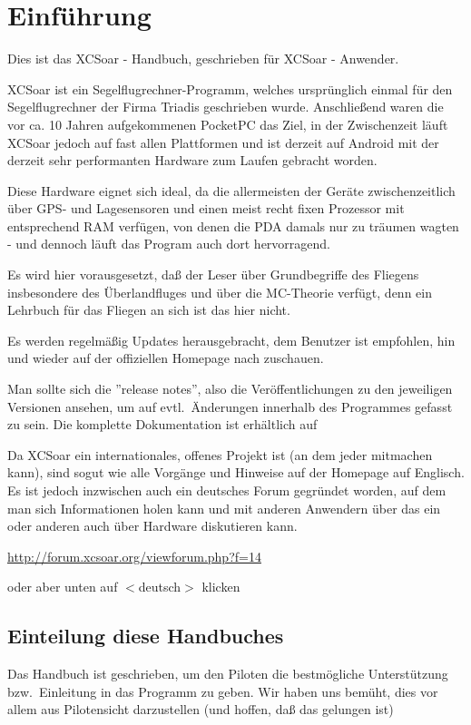 \chapter{Einführung}\label{cha:introduction}
Dies ist das \textsf{XCSoar} - Handbuch, geschrieben für \textsf{XCSoar} - Anwender. 

 

\textsf{XCSoar} ist ein Segelflugrechner-Programm, welches ursprünglich einmal für den Segelflugrechner \al der Firma Triadis geschrieben wurde.  
Anschließend waren die vor ca. 10 Jahren aufgekommenen PocketPC das Ziel, in der Zwischenzeit läuft \textsf{XCSoar} jedoch auf fast allen Plattformen und ist derzeit auf Android mit der derzeit 
sehr performanten Hardware zum Laufen gebracht worden. 

Diese Hardware eignet sich ideal, da die allermeisten der Geräte zwischenzeitlich über GPS- und Lagesensoren und einen 
meist recht fixen Prozessor mit entsprechend RAM verfügen, von denen die PDA damals nur zu träumen wagten - und dennoch 
läuft das Program auch dort hervorragend. 


Es wird hier vorausgesetzt, daß der Leser über Grundbegriffe des Fliegens insbesondere des Überlandfluges 
und über die MC-Theorie verfügt, denn ein Lehrbuch für das Fliegen an sich ist das hier nicht.


Es werden regelmäßig Updates herausgebracht, dem Benutzer ist empfohlen, hin und wieder auf der offiziellen Homepage nach zuschauen. 

Man sollte sich die ''release notes'', also die Veröffentlichungen zu den jeweiligen Versionen ansehen, um  auf evtl.\ Änderungen innerhalb des Programmes gefasst zu sein. 
Die komplette Dokumentation ist erhältlich auf  
\begin{center}
\xcsoarwebsite{}
\end{center}
Da \textsf{XCSoar} ein internationales, offenes Projekt ist (an dem jeder mitmachen kann), sind sogut wie alle Vorgänge und Hinweise auf der Homepage auf Englisch. 
Es ist jedoch inzwischen auch ein deutsches Forum gegründet worden, auf dem man sich Informationen holen kann und mit anderen Anwendern über das ein oder anderen auch über Hardware diskutieren kann.
\begin{center}
\url{http://forum.xcsoar.org/viewforum.php?f=14}
\end{center}
oder aber unten auf $<$deutsch$>$ klicken

\section{Einteilung diese Handbuches}
Das Handbuch ist geschrieben, um den Piloten die bestmögliche Unterstützung bzw.\ Einleitung in das Programm zu geben. 
Wir haben uns bemüht, dies vor allem aus Pilotensicht darzustellen (und hoffen, daß das gelungen ist) 

